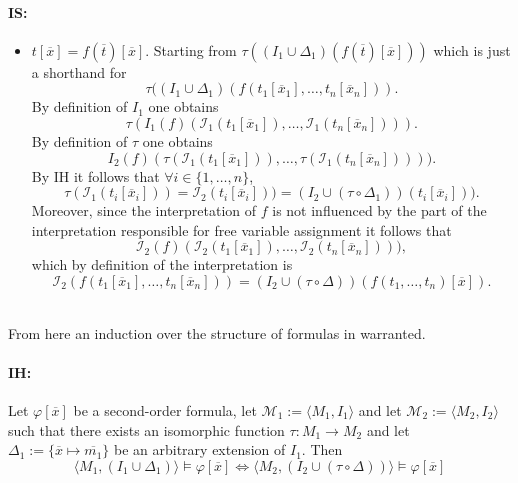 \documentclass[11pt,a4paper]{article}
\begin{document}
\paragraph*{IS:}
\begin{itemize}[leftmargin=*]
\item $t[\overline{x}]=f(\overline{t})[\overline{x}]$. Starting from $\tau((I_1 \cup \Delta_1)(f(\overline{t})[\overline{x}]))$ which is just a shorthand for 
\begin{equation*}
\tau((I_1 \cup \Delta_1)(f(t_1[\overline{x}_1], \dots, t_n[\overline{x}_n])).
\end{equation*} 
By definition of $I_1$ one obtains 
\begin{equation*}
\tau(I_1(f)(\mathcal{I}_1(t_1[\overline{x}_1]), \dots, \mathcal{I}_1(t_n[\overline{x}_n]))).
\end{equation*} 
By definition of $\tau$ one obtains 
\begin{equation*}
I_2(f)(\tau(\mathcal{I}_1(t_1[\overline{x}_1])), \dots, \tau(\mathcal{I}_1(t_n[\overline{x}_n])))).
\end{equation*}
 By IH it follows that $\forall i \in \{1,\dots ,n\}$,
\begin{equation*}
\tau(\mathcal{I}_1(t_i[\overline{x}_i])) = \mathcal{I}_2(t_i[\overline{x}_i])) = (I_2\cup (\tau \circ \Delta_1))(t_i[\overline{x}_i])).
\end{equation*}
Moreover, since the interpretation of $f$ is not influenced by the part of the interpretation responsible for free variable assignment it follows that 
\begin{equation*}
\mathcal{I}_2(f)(\mathcal{I}_2(t_1[\overline{x}_1]), \dots, \mathcal{I}_2(t_n[\overline{x}_n]))),
\end{equation*}
which by definition of the interpretation is 
\begin{equation*}
\mathcal{I}_2(f(t_1[\overline{x}_1], \dots, t_n[\overline{x}_n]))= (I_2 \cup (\tau \circ \Delta))(f(t_1, \dots, t_n)[\overline{x}]).
\end{equation*}\\

\end{itemize}

From here an induction over the structure of formulas in warranted.


\paragraph*{IH:} Let $\varphi[\overline{x}]$ be a second-order formula, let $\mathcal{M}_1 := \langle M_1, I_1\rangle$ and let $\mathcal{M}_2 := \langle M_2, I_2\rangle$ such that there exists an isomorphic function $\tau : M_1 \to M_2$ and let $\Delta_1:= \{\overline{x} \mapsto \overline{m_1}\}$ be an arbitrary extension of $I_1$. Then 
\begin{equation*}
\langle M_1, (I_1 \cup \Delta_1) \rangle \models \varphi[\overline{x}] \iff \langle M_2, (I_2 \cup (\tau \circ \Delta)) \rangle \models \varphi[\overline{x}]
\end{equation*}
\end{document}
